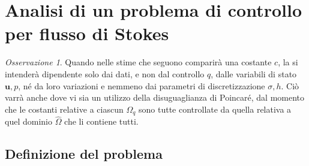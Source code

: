 \documentclass[a4paper,11pt,twoside]{article}
\renewcommand{\u}{\mathbf{u}}
\theoremstyle{plain}
\theoremstyle{definition}
\theoremstyle{remark}
\newtheorem{oss}{Osservazione}
\begin{document}
\section{Analisi di un problema di controllo per flusso di Stokes}

\begin{oss}
	Quando nelle stime che seguono comparirà una costante $c$, la si intenderà dipendente solo dai dati, e non dal controllo $q$, dalle variabili di stato $\u,p$, né da loro variazioni e nemmeno dai parametri di discretizzazione $\sigma,h$. Ciò varrà anche dove vi sia un utilizzo della disuguaglianza di Poincaré, dal momento che le costanti relative a ciascun $\Omega_q$ sono tutte controllate da quella relativa a quel dominio $\hat{\Omega}$ che li contiene tutti.
\end{oss}
\subsection{Definizione del problema}\label{sec:def}
\end{document}
